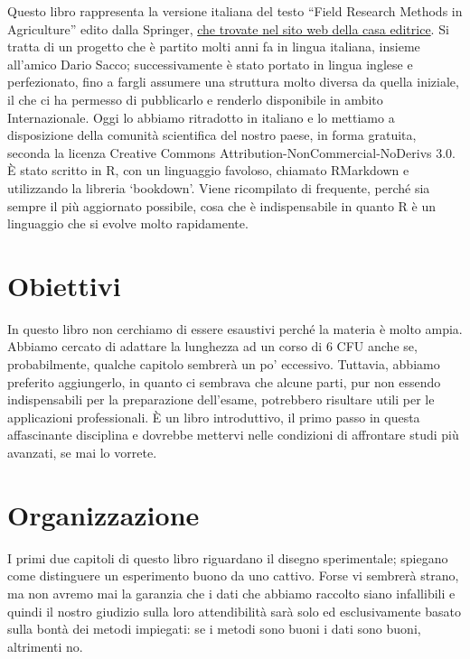 \documentclass[
  12pt,
]{book}
\begin{document}
Questo libro rappresenta la versione italiana del testo ``Field Research Methods in Agriculture'' edito dalla Springer, \href{https://link.springer.com/book/10.1007/978-3-032-08199-5}{che trovate nel sito web della casa editrice}. Si tratta di un progetto che è partito molti anni fa in lingua italiana, insieme all'amico Dario Sacco; successivamente è stato portato in lingua inglese e perfezionato, fino a fargli assumere una struttura molto diversa da quella iniziale, il che ci ha permesso di pubblicarlo e renderlo disponibile in ambito Internazionale. Oggi lo abbiamo ritradotto in italiano e lo mettiamo a disposizione della comunità scientifica del nostro paese, in forma gratuita, seconda la licenza Creative Commons Attribution-NonCommercial-NoDerivs 3.0. È stato scritto in R, con un linguaggio favoloso, chiamato RMarkdown e utilizzando la libreria `bookdown'. Viene ricompilato di frequente, perché sia sempre il più aggiornato possibile, cosa che è indispensabile in quanto R è un linguaggio che si evolve molto rapidamente.

\hypertarget{obiettivi}{%
\section*{Obiettivi}\label{obiettivi}}

In questo libro non cerchiamo di essere esaustivi perché la materia è molto ampia. Abbiamo cercato di adattare la lunghezza ad un corso di 6 CFU anche se, probabilmente, qualche capitolo sembrerà un po' eccessivo. Tuttavia, abbiamo preferito aggiungerlo, in quanto ci sembrava che alcune parti, pur non essendo indispensabili per la preparazione dell'esame, potrebbero risultare utili per le applicazioni professionali. È un libro introduttivo, il primo passo in questa affascinante disciplina e dovrebbe mettervi nelle condizioni di affrontare studi più avanzati, se mai lo vorrete.

\hypertarget{organizzazione}{%
\section*{Organizzazione}\label{organizzazione}}

I primi due capitoli di questo libro riguardano il disegno sperimentale; spiegano come distinguere un esperimento buono da uno cattivo. Forse vi sembrerà strano, ma non avremo mai la garanzia che i dati che abbiamo raccolto siano infallibili e quindi il nostro giudizio sulla loro attendibilità sarà solo ed esclusivamente basato sulla bontà dei metodi impiegati: se i metodi sono buoni i dati sono buoni, altrimenti no.
\end{document}
